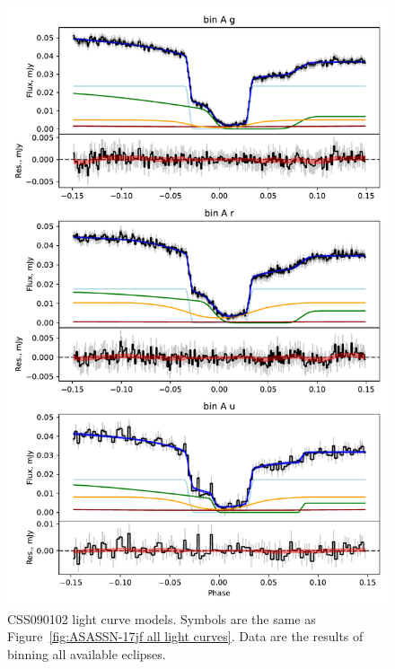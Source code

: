 %     

\begin{figure}
    \centering
    \includegraphics[width=\textwidth]{figures/results/CSS090102/CSS090102_1.pdf}
    \caption{CSS090102 light curve models. Symbols are the same as Figure~\ref{fig:ASASSN-17jf all light curves}. Data are the results of binning all available eclipses.}
    \label{fig:CSS090102 all light curves}
\end{figure}
